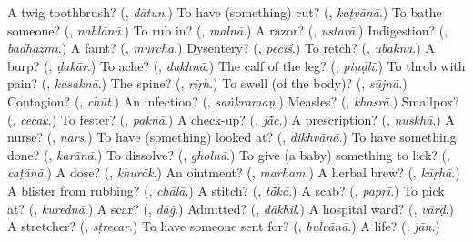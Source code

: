 \begin{tcolorbox}[breakable,colback=teal!4,colframe=teal!35!black,title={Before you move on}]
A twig toothbrush? (\textbf{}, \emph{dātun}.) To have (something) cut? (\textbf{}, \emph{kaṭvānā}.) To bathe someone? (\textbf{}, \emph{nahlānā}.) To rub in? (\textbf{}, \emph{malnā}.) A razor? (\textbf{}, \emph{ustarā}.) Indigestion? (\textbf{}, \emph{badhazmī}.) A faint? (\textbf{}, \emph{mūrchā}.) Dysentery? (\textbf{}, \emph{peciś}.) To retch? (\textbf{}, \emph{ubaknā}.) A burp? (\textbf{}, \emph{ḍakār}.) To ache? (\textbf{}, \emph{dukhnā}.) The calf of the leg? (\textbf{}, \emph{piṇḍlī}.) To throb with pain? (\textbf{}, \emph{kasaknā}.) The spine? (\textbf{}, \emph{rīṛh}.) To swell (of the body)? (\textbf{}, \emph{sūjnā}.) Contagion? (\textbf{}, \emph{chūt}.) An infection? (\textbf{}, \emph{saṅkramaṇ}.) Measles? (\textbf{}, \emph{khasrā}.) Smallpox? (\textbf{}, \emph{cecak}.) To fester? (\textbf{}, \emph{paknā}.) A check-up? (\textbf{}, \emph{jā̃c}.) A prescription? (\textbf{}, \emph{nuskhā}.) A nurse? (\textbf{}, \emph{nars}.) To have (something) looked at? (\textbf{}, \emph{dikhvānā}.) To have something done? (\textbf{}, \emph{karānā}.) To dissolve? (\textbf{}, \emph{gholnā}.) To give (a baby) something to lick? (\textbf{}, \emph{caṭānā}.) A dose? (\textbf{}, \emph{khurāk}.) An ointment? (\textbf{}, \emph{marham}.) A herbal brew? (\textbf{}, \emph{kāṛhā}.) A blister from rubbing? (\textbf{}, \emph{chālā}.) A stitch? (\textbf{}, \emph{ṭā̃kā}.) A scab? (\textbf{}, \emph{papṛī}.) To pick at? (\textbf{}, \emph{kurednā}.) A scar? (\textbf{}, \emph{dāġ}.) Admitted? (\textbf{}, \emph{dākhil}.) A hospital ward? (\textbf{}, \emph{vārḍ}.) A stretcher? (\textbf{}, \emph{sṭrecar}.) To have someone sent for? (\textbf{}, \emph{bulvānā}.) A life? (\textbf{}, \emph{jān}.)
\end{tcolorbox}
